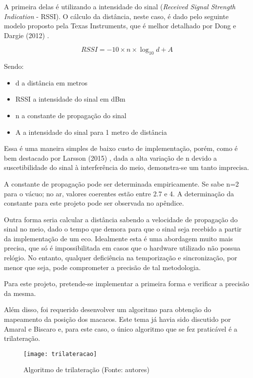 A primeira delas é utilizando a intensidade do sinal (\textit{Received Signal Strength Indication} - RSSI). O cálculo da distância, neste caso, é dado pelo seguinte modelo proposto pela Texas Instruments, que é melhor detalhado por Dong e Dargie (2012) \cite{dong}.

\begin{equation}
RSSI = -10 \times n \times \log_{10} d + A
\end{equation}

Sendo:
\begin{itemize}
\item d a distância em metros
\item RSSI a intensidade do sinal em dBm
\item n a constante de propagação do sinal
\item A a intensidade do sinal para 1 metro de distância
\end{itemize}

Essa é uma maneira simples de baixo custo de implementação, porém, como é bem destacado por Larsson (2015) \cite{larsson}, dada a alta variação de n devido a suscetibilidade do sinal à interferência do meio, demonstra-se um tanto imprecisa.

A constante de propagação pode ser determinada empiricamente. Se sabe n=2 para o vácuo; no ar, valores coerentes estão entre 2.7 e 4. A determinação da constante para este projeto pode ser observada no apêndice.

Outra forma seria calcular a distância sabendo a velocidade de propagação do sinal no meio, dado o tempo que demora para que o sinal seja recebido a partir da implementação de um eco. Idealmente esta é uma abordagem muito mais precisa, que só é impossibilitada em casos que o hardware utilizado não possua relógio. No entanto, qualquer deficiência na temporização e sincronização, por menor que seja, pode comprometer a precisão de tal metodologia.

Para este projeto, pretende-se implementar a primeira forma e verificar a precisão da mesma.

Além disso, foi requerido desenvolver um algoritmo para obtenção do mapeamento da posição dos macacos. Este tema já havia sido discutido por Amaral e Biscaro \cite{larissaamaralmiltonbiscaro} e, para este caso, o único algoritmo que se fez praticável é a trilateração.

\begin{figure}[ht]
  \centering
    \texttt{[image: trilateracao]}
  \caption{Algoritmo de trilateração (Fonte: autores)}
\end{figure}
\FloatBarrier

